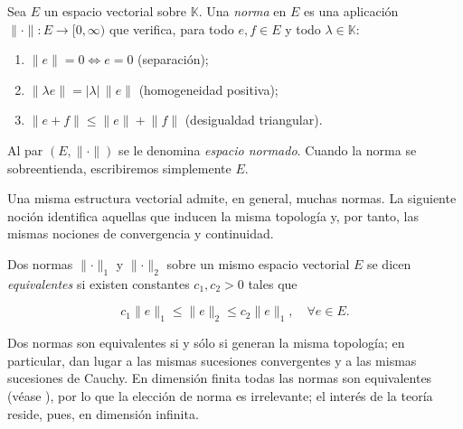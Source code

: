 \begin{Definicion}
\label{ch:preliminares:def:espacioNormado}

Sea $E$ un espacio vectorial sobre $\mathbb{K}$. Una \textit{norma} en $E$ es una
aplicación $\lVert \cdot \rVert : E \rightarrow [0, \infty)$ que verifica, para
todo $e, f \in E$ y todo $\lambda \in \mathbb{K}$:

\begin{enumerate}
    \item $\lVert e \rVert = 0 \iff e = 0$ (separación);
    \item $\lVert \lambda e \rVert = |\lambda| \, \lVert e \rVert$ (homogeneidad positiva);
    \item $\lVert e + f \rVert \leq \lVert e \rVert + \lVert f \rVert$ (desigualdad triangular).
\end{enumerate}

Al par $(E, \lVert \cdot \rVert)$ se le denomina \textit{espacio normado}. Cuando
la norma se sobreentienda, escribiremos simplemente $E$.
\end{Definicion}

Una misma estructura vectorial admite, en general, muchas normas. La siguiente
noción identifica aquellas que inducen la misma topología y, por tanto, las
mismas nociones de convergencia y continuidad.\\

\begin{Definicion}
\label{ch:preliminares:def:normasEquivalentes}

Dos normas $\lVert \cdot \rVert_1$ y $\lVert \cdot \rVert_2$ sobre un mismo
espacio vectorial $E$ se dicen \textit{equivalentes} si existen constantes
$c_1, c_2 > 0$ tales que

\[c_1 \lVert e \rVert_1 \leq \lVert e \rVert_2 \leq c_2 \lVert e \rVert_1, \quad \forall e \in E.\]
\end{Definicion}

\begin{Observacion}
\label{ch:preliminares:obs:normasEquivalentes}
Dos normas son equivalentes si y sólo si generan la misma topología; en
particular, dan lugar a las mismas sucesiones convergentes y a las mismas
sucesiones de Cauchy. En dimensión finita todas las normas son equivalentes
(véase \cite[Teorema~III.3.1]{conway-1990-cou-fun-ana}), por lo que la elección
de norma es irrelevante; el interés de la teoría reside, pues, en dimensión
infinita.
\end{Observacion}

